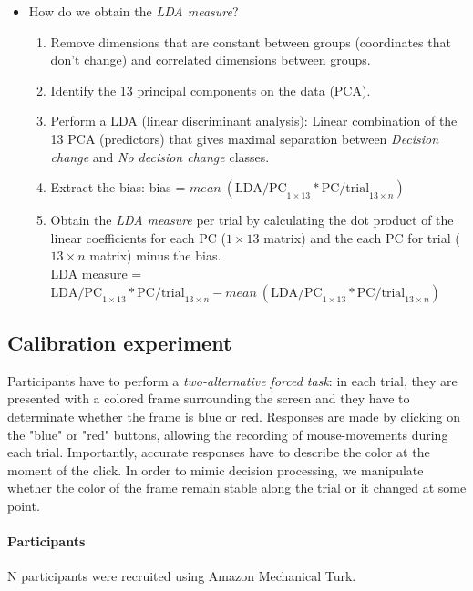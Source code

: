 \documentclass{article}
\newcommand{\nbMM}[1]{{\leavevmode\color{red}{\scriptsize#1}}}
\begin{document}
\begin{itemize}
\item How do we obtain the \emph{LDA measure}? \nbMM{MM: I need to review this with Ewan. There are some steps for which I am not sure.} 
\begin{enumerate}
\item Remove dimensions that are constant between groups (coordinates that don’t change) and correlated dimensions between groups. 
\item Identify the 13 principal components on the data (PCA). 
\item Perform a LDA (linear discriminant analysis): Linear combination of the 13 PCA (predictors) that gives maximal separation between \emph{Decision change} and \emph{No decision change} classes.
\item Extract the bias: bias = $mean \ (\text{LDA/PC}_{1\times 13} \ast \text{PC/trial}_{13\times n})$
\item Obtain the \emph{LDA measure} per trial by calculating the dot product of the linear coefficients for each PC ($1\times13$ matrix) and the each PC for trial ($13 \times n$ matrix) minus the bias. \\
LDA measure = \( \text{LDA/PC}_{1\times 13} \ast \text{PC/trial}_{13\times n} -  mean \ (\text{LDA/PC}_{1\times 13} \ast \text{PC/trial}_{13\times n}) \)

\end{enumerate}


\end{itemize}

\subsection{Calibration experiment}
Participants have to perform a \emph{two-alternative forced task}: in each trial, they are presented with a colored frame surrounding the screen and they have to determinate whether the frame is blue or red. 
Responses are made by clicking on the "blue" or "red" buttons, allowing the recording of mouse-movements during each trial. Importantly, accurate responses have to describe the color at the moment of the click. In order to mimic decision processing, we manipulate whether the color of the frame remain stable along the trial or it changed at some point. 

\nbMM{MM: All this should be corrected and made specific once we run the actual calibration with the frames.}

\paragraph{Participants} N participants were recruited using Amazon Mechanical Turk. 
\end{document}
